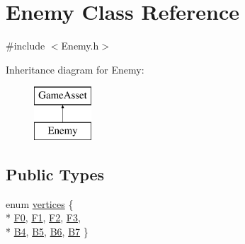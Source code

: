 \hypertarget{classEnemy}{\section{Enemy Class Reference}
\label{classEnemy}
}


{\ttfamily \#include $<$Enemy.\-h$>$}

Inheritance diagram for Enemy\-:\begin{figure}[H]
\begin{center}
\leavevmode
\includegraphics[height=2.000000cm]{classEnemy}
\end{center}
\end{figure}
\subsection*{Public Types}
\begin{DoxyCompactItemize}
\item 
enum \hyperlink{classEnemy_a60fed95ba2edb2a005487c91711fe7d1}{vertices} \{ \\*
\hyperlink{classEnemy_a60fed95ba2edb2a005487c91711fe7d1a27984980bad3e49e3a78994281d6949b}{F0}, 
\hyperlink{classEnemy_a60fed95ba2edb2a005487c91711fe7d1ab95fca6d288fdaa674e85ae46e366e2d}{F1}, 
\hyperlink{classEnemy_a60fed95ba2edb2a005487c91711fe7d1abef72d551f5d130fd850384d075a27d2}{F2}, 
\hyperlink{classEnemy_a60fed95ba2edb2a005487c91711fe7d1a28b74a906d078973f1d59203d964c045}{F3}, 
\\*
\hyperlink{classEnemy_a60fed95ba2edb2a005487c91711fe7d1a32ab5408a61c9a05baada047eaceb025}{B4}, 
\hyperlink{classEnemy_a60fed95ba2edb2a005487c91711fe7d1a00ceaccae0110cd22f3d466348cda9e0}{B5}, 
\hyperlink{classEnemy_a60fed95ba2edb2a005487c91711fe7d1a0822565cdeeb34f9027775bab8f9ae0a}{B6}, 
\hyperlink{classEnemy_a60fed95ba2edb2a005487c91711fe7d1a5ab58c1a775f2759b6bd7fc6f97515df}{B7}
 \}
\end{DoxyCompactItemize}
